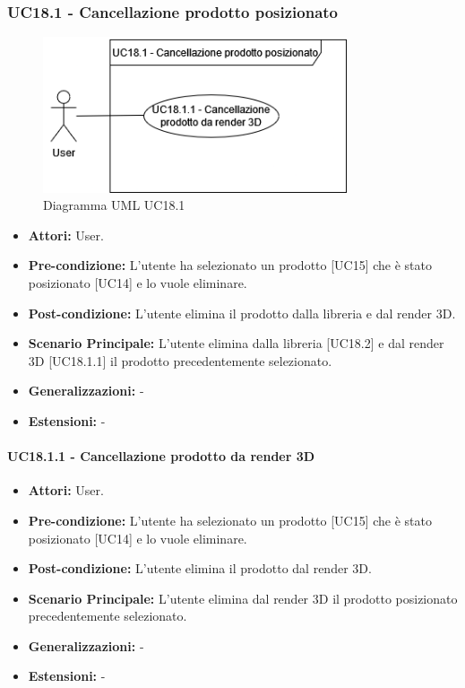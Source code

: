 \subsubsection{UC18.1 - Cancellazione prodotto posizionato}
\begin{figure}[H]
  \centering
  \includegraphics[width=0.8\textwidth]{UC_diagrams_11-20/UC18.1.drawio.png}
   \caption{Diagramma UML UC18.1}
\end{figure}
\begin{itemize}
    \item \textbf{Attori:} User.
    \item \textbf{Pre-condizione:} L'utente ha selezionato un prodotto [UC15] che è stato posizionato [UC14] e lo vuole eliminare.
    \item \textbf{Post-condizione:} L'utente elimina il prodotto dalla libreria e dal render 3D.
    \item \textbf{Scenario Principale:} L'utente elimina dalla libreria [UC18.2] e dal render 3D [UC18.1.1] il prodotto precedentemente selezionato.   
    \item \textbf{Generalizzazioni:} -
    \item \textbf{Estensioni:} -
\end{itemize}


\paragraph{UC18.1.1 - Cancellazione prodotto da render 3D}
\begin{itemize}
    \item \textbf{Attori:} User.
    \item \textbf{Pre-condizione:} L'utente ha selezionato un prodotto [UC15] che è stato posizionato [UC14] e lo vuole eliminare.
    \item \textbf{Post-condizione:} L'utente elimina il prodotto dal render 3D.
    \item \textbf{Scenario Principale:} L'utente elimina dal render 3D il prodotto posizionato precedentemente selezionato.   
    \item \textbf{Generalizzazioni:} -
    \item \textbf{Estensioni:} -
\end{itemize}


